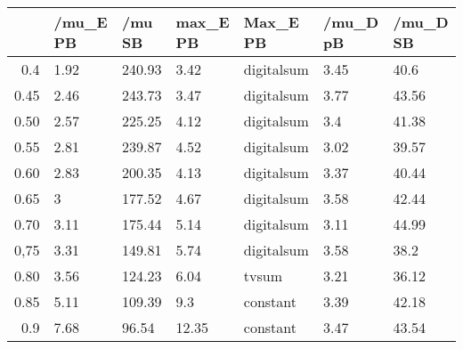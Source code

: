 \begin{table}[ht]
\centering
\begin{tabular}{rllllll}
  \hline
 & /mu\_E PB & /mu SB & max\_E PB & Max\_E PB & /mu\_D pB & /mu\_D SB \\ 
  \hline
0.4 & 1.92 & 240.93 & 3.42 & digitalsum & 3.45 & 40.6 \\ 
  0.45 & 2.46 & 243.73 & 3.47 & digitalsum & 3.77 & 43.56 \\ 
  0.50 & 2.57 & 225.25 & 4.12 & digitalsum & 3.4 & 41.38 \\ 
  0.55 & 2.81 & 239.87 & 4.52 & digitalsum & 3.02 & 39.57 \\ 
  0.60 & 2.83 & 200.35 & 4.13 & digitalsum & 3.37 & 40.44 \\ 
  0.65 & 3 & 177.52 & 4.67 & digitalsum & 3.58 & 42.44 \\ 
  0.70 & 3.11 & 175.44 & 5.14 & digitalsum & 3.11 & 44.99 \\ 
  0,75 & 3.31 & 149.81 & 5.74 & digitalsum & 3.58 & 38.2 \\ 
  0.80 & 3.56 & 124.23 & 6.04 & tvsum & 3.21 & 36.12 \\ 
  0.85 & 5.11 & 109.39 & 9.3 & constant & 3.39 & 42.18 \\ 
  0.9 & 7.68 & 96.54 & 12.35 & constant & 3.47 & 43.54 \\ 
   \hline
\end{tabular}
\end{table}
